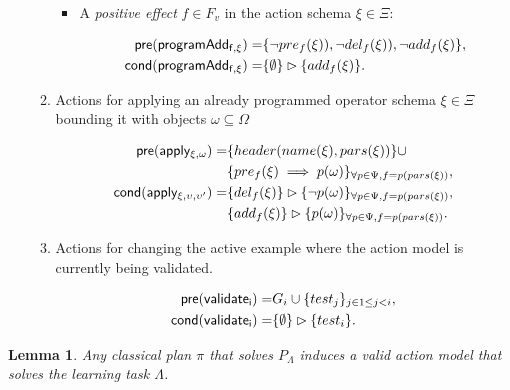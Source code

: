 \documentclass[letterpaper]{article} %
\newcommand{\pre}{\mathsf{pre}}     %
\newcommand{\cond}{\mathsf{cond}}   %
\newtheorem{lemma}[theorem]{Lemma}
\begin{document}
\begin{itemize}
\begin{enumerate}
\begin{itemize}
\item A {\em positive effect} $f\in F_v$ in the action schema $\xi\in\Xi$:
\begin{small}
\begin{align*}
\hspace*{7pt}\pre(\mathsf{programAdd_{f,\xi}})=&\{\neg pre_{f}(\xi)),\neg del_{f}(\xi)),\neg add_{f}(\xi)\},\\                                                   
\cond(\mathsf{programAdd_{f,\xi}})=&\{\emptyset\}\rhd\{add_{f}(\xi)\}.
\end{align*}
\end{small}
\end{itemize}

\item Actions for applying an already programmed operator schema $\xi\in\Xi$ bounding it with objects $\omega\subseteq\Omega$
\begin{small}
\begin{align*}
\hspace*{7pt}\pre(\mathsf{apply_{\xi,\omega}})=&\{header(name(\xi),pars(\xi))\}\cup\\     
                                           &\{pre_{f}(\xi)\implies p(\omega)\}_{\forall p\in\Psi,f=p(pars(\xi))},\\
\cond(\mathsf{apply_{\xi,\upsilon,\upsilon'}})=&\{del_{f}(\xi)\}\rhd\{\neg p(\omega)\}_{\forall p\in\Psi,f=p(pars(\xi))},\\
&\{add_{f}(\xi)\}\rhd\{p(\omega)\}_{\forall p\in\Psi,f=p(pars(\xi))}.
\end{align*}
\end{small}


\item Actions for changing the active example where the action model is currently being validated.
\begin{small}
\begin{align*}
\hspace*{7pt}\pre(\mathsf{validate_{i}})=&G_i\cup\{test_j\}_{j\in 1\leq j<i},\\
\cond(\mathsf{validate_{i}})=&\{\emptyset\}\rhd\{test_i\}.
\end{align*}
\end{small}
\end{enumerate}
\end{itemize}


\begin{lemma}
Any classical plan $\pi$ that solves $P_{\Lambda}$ induces a valid action model that solves the learning task $\Lambda$.
\end{lemma}
\end{document}
